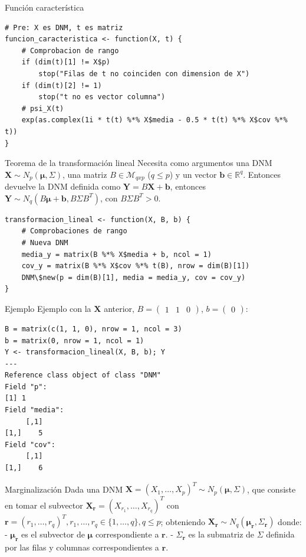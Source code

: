\documentclass[xcolor=table]{beamer}
\begin{document}
\begin{frame}[fragile]{Función característica}
  \begin{lstlisting}
# Pre: X es DNM, t es matriz
funcion_caracteristica <- function(X, t) {
    # Comprobacion de rango
    if (dim(t)[1] != X$p)
        stop("Filas de t no coinciden con dimension de X")
    if (dim(t)[2] != 1)
        stop("t no es vector columna")
    # psi_X(t)
    exp(as.complex(1i * t(t) %*% X$media - 0.5 * t(t) %*% X$cov %*% t))
}
  \end{lstlisting}
\end{frame}

\begin{frame}[fragile]{Teorema de la transformación lineal}
Necesita como argumentos una DNM $\pmb{X} \sim N_p(\pmb{\mu}, \Sigma)$, una matriz $B \in \mathcal{M}_{qxp}$ ($q \leq p$) y un vector $\pmb{b} \in \mathbb{R}^q$. Entonces devuelve la DNM definida como $\pmb{Y} = B \pmb{X} + \pmb{b}$, entonces $\pmb{Y} \sim N_q(B \pmb{\mu} + \pmb{b}, B \Sigma B^T)$, con $B\Sigma B^T > 0$.

\begin{lstlisting}
transformacion_lineal <- function(X, B, b) {
    # Comprobaciones de rango
    # Nueva DNM
    media_y = matrix(B %*% X$media + b, ncol = 1)
    cov_y = matrix(B %*% X$cov %*% t(B), nrow = dim(B)[1])
    DNM\$new(p = dim(B)[1], media = media_y, cov = cov_y)
}
\end{lstlisting}
\end{frame}
\begin{frame}[fragile]{Ejemplo}
Ejemplo con la $\pmb{X}$ anterior, $B = \begin{pmatrix} 1 & 1 & 0 \end{pmatrix}$, $b = \begin{pmatrix} 0 \end{pmatrix}$:
\begin{lstlisting}
B = matrix(c(1, 1, 0), nrow = 1, ncol = 3)
b = matrix(0, nrow = 1, ncol = 1)
Y <- transformacion_lineal(X, B, b); Y
---
Reference class object of class "DNM"
Field "p":
[1] 1
Field "media":
     [,1]
[1,]    5
Field "cov":
     [,1]
[1,]    6
\end{lstlisting}
\end{frame}


\begin{frame}[fragile]{Marginalización}
Dada una DNM $\pmb{X} = (X_1, \ldots, X_p)^T \sim N_p(\pmb{\mu}, \Sigma)$, que consiste en tomar el subvector $\pmb{X}_{\pmb{r}} = (X_{r_1}, \ldots, X_{r_q})^T$ con $\pmb{r} = (r_1, \ldots, r_q)^T, r_1, \ldots, r_q \in \{1, \ldots, q\}, q \leq p $; obteniendo $\pmb{X}_{\pmb{r}} \sim N_q(\pmb{\mu_{\pmb{r}}}, \Sigma_{\pmb{r}})$ donde:
- $\pmb{\mu_{\pmb{r}}}$ es el subvector de $\pmb{\mu}$ correspondiente a $\pmb{r}$.
- $\Sigma_{\pmb{r}}$ es la submatriz de $\Sigma$ definida por las filas y columnas correspondientes a $\pmb{r}$.
\end{frame}
\end{document}
